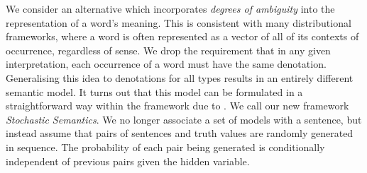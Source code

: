 \documentclass[manuscript]{clv2}
\newcommand{\newcite}[1]{\namecite{#1}}
\begin{document}


We consider an alternative which incorporates \emph{degrees of ambiguity} into the representation of a word's meaning. This is consistent with many distributional  frameworks, where a word is often represented as a vector of all of its contexts of occurrence, regardless of sense. 
We drop the requirement that in any given interpretation, each occurrence of a word must have the same denotation. Generalising this idea to denotations for all types results in an entirely different semantic model. It turns out that this model can be formulated in a straightforward way within the framework due to \newcite{Sato:97}. We call our new framework \emph{Stochastic Semantics}.  We no longer
associate a set of models with a sentence, but instead assume that pairs of sentences and
truth values are randomly generated in sequence. The probability of
each pair being generated is conditionally independent of previous
pairs given the hidden variable.

\end{document}

